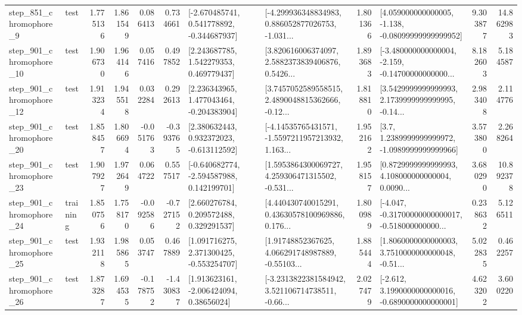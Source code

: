 \begin{tabular}{llrrrrllrlrr}
   step\_851\_chromophore\_9 &      test &      1.775136 &    1.861549 &      0.086413 &  0.734661 &   [-2.670485741, 0.541778892, -0.344687937] &  [-4.299936348834983, 0.886052877026753, -1.031... &       1.801366 &  [4.059000000000005, -1.138, -0.08099999999999952] &            9.303877 &         14.862983 \\
  step\_901\_chromophore\_10 &      test &      1.906730 &    1.964146 &      0.057416 &  0.497852 &     [2.243687785, 1.542279353, 0.469779437] &  [3.820616006374097, 2.5882373839406876, 0.5426... &       1.893683 &  [-3.480000000000004, -2.159, -0.14700000000000... &            8.182603 &          5.184587 \\
  step\_901\_chromophore\_12 &      test &      1.913234 &    1.945518 &      0.032284 &  0.292613 &    [2.236343965, 1.477043464, -0.204383904] &  [3.7457052589558515, 2.4890048815362666, -0.12... &       1.818810 &  [3.5429999999999993, 2.1739999999999995, -0.14... &            2.983408 &          2.114776 \\
  step\_901\_chromophore\_20 &      test &      1.858457 &    1.806694 &     -0.051763 & -0.393765 &    [2.380632443, 0.932372023, -0.613112592] &  [-4.14535765431571, -1.5597211957213932, 1.163... &       1.952162 &     [3.7, 1.2389999999999972, -1.0989999999999966] &            3.573800 &          2.268264 \\
  step\_901\_chromophore\_23 &      test &      1.907927 &    1.972649 &      0.064722 &  0.557517 &   [-0.640682774, -2.594587988, 0.142199701] &  [1.5953864300069727, 4.259306471315502, -0.531... &       1.958157 &  [0.8729999999999993, 4.108000000000004, 0.0090... &            3.680290 &         10.892378 \\
  step\_901\_chromophore\_24 &  training &      1.850756 &    1.758170 &     -0.092586 & -0.727152 &     [2.660276784, 0.209572488, 0.329291537] &  [4.440430740015291, 0.43630578100969886, 0.176... &       1.800989 &  [-4.047, -0.31700000000000017, -0.518000000000... &            0.238632 &          5.126511 \\
  step\_901\_chromophore\_25 &      test &      1.932118 &    1.985865 &      0.053747 &  0.467889 &    [1.091716275, 2.371300425, -0.553254707] &  [1.91748852367625, 4.066291748987889, -0.55103... &       1.885444 &  [1.8060000000000003, 3.7510000000000048, -0.51... &            5.022835 &          0.462257 \\
  step\_901\_chromophore\_26 &      test &      1.873287 &    1.694535 &     -0.178752 & -1.430837 &     [1.913623161, -2.006424094, 0.38656024] &  [-3.2313822381584942, 3.521106714738511, -0.66... &       2.027479 &  [-2.612, 3.1990000000000016, -0.6890000000000001] &            4.623202 &          3.600220 \\

\end{tabular}

